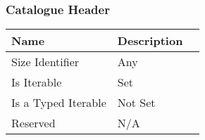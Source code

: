 \documentclass[11pt]{article}
\begin{document}
\subsubsection{Catalogue Header}

\begin{center}
\begin{tabular}{ |l|l|l| } 
\hline
\textbf{Name} & \textbf{Description}\\
\hline
Size Identifier & Any \\
Is Iterable & Set \\
Is a Typed Iterable & Not Set \\   
Reserved & N/A \\ 
\hline
\end{tabular}
\end{center}

\end{document}
